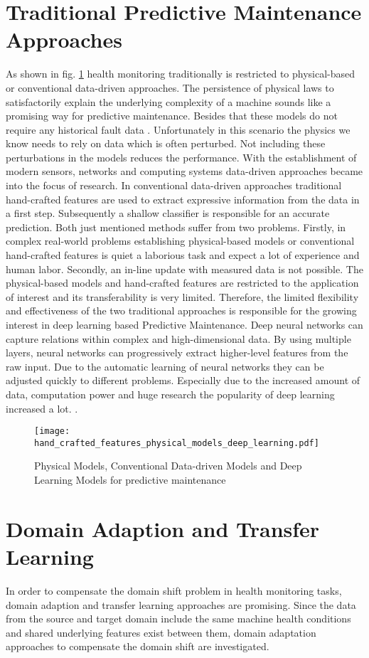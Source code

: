\section{Traditional Predictive Maintenance Approaches}
As shown in fig. \ref{fig:hand_crafted_features_physical_models_deep_learning} health monitoring traditionally is restricted to physical-based or conventional data-driven approaches. The persistence of  physical laws to satisfactorily explain the underlying complexity of a machine sounds like a promising way for predictive maintenance. Besides that these models do not require any historical fault data \cite{AN201942}. Unfortunately in this scenario the physics we know needs to rely on data which is often perturbed. Not including these perturbations in the models reduces the performance. With the establishment of modern sensors, networks and computing systems data-driven approaches became into the focus of research. In conventional data-driven approaches traditional hand-crafted features are used to extract expressive information from the data in a first step. Subsequently a shallow classifier is responsible for an accurate prediction. Both just mentioned methods suffer from two problems. Firstly, in complex real-world problems establishing physical-based models or conventional hand-crafted features is quiet a laborious task and expect a lot of experience and human labor. Secondly, an in-line update with measured data is not possible. The physical-based models and hand-crafted features are restricted to the application of interest and its transferability is very limited. Therefore, the limited flexibility and effectiveness of the two traditional approaches is responsible for the growing interest in deep learning based Predictive Maintenance. Deep neural networks can capture relations within complex and high-dimensional data. By using multiple layers, neural networks can progressively extract higher-level features from the raw input. Due to the automatic learning of neural networks they can be adjusted quickly to different problems. Especially due to the increased amount of data, computation power and huge research the popularity of deep learning increased a lot.  \cite{ZHAO2019213} \cite{AZAMFAR2020103932}. 

\begin{figure}[htpb]
  \centering
  \texttt{[image: hand\_crafted\_features\_physical\_models\_deep\_learning.pdf]}
  \caption {Physical Models, Conventional Data-driven Models and Deep Learning Models for predictive maintenance \cite{ZHAO2019213}} \label{fig:hand_crafted_features_physical_models_deep_learning}
\end{figure}

\section{Domain Adaption and Transfer Learning}
In order to compensate the domain shift problem in health monitoring tasks, domain adaption and transfer learning approaches are promising. Since the data from the source and target domain include the same machine health conditions and shared underlying features exist between them, domain adaptation approaches to compensate the domain shift are investigated. 
